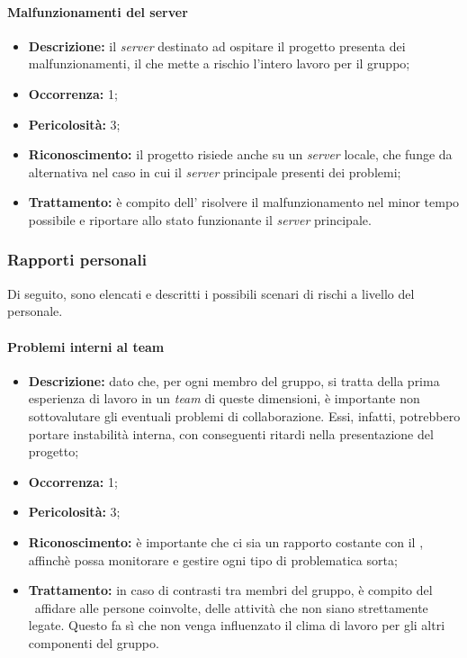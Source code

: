 \paragraph{Malfunzionamenti del server}
\begin{itemize}
	\item \textbf{Descrizione:} il \textit{server} destinato ad ospitare il progetto presenta dei malfunzionamenti, il che mette a rischio l'intero lavoro per il gruppo;
	\item \textbf{Occorrenza:} 1;
	\item \textbf{Pericolosità:} 3;
	\item \textbf{Riconoscimento:} il progetto risiede anche su un \textit{server} locale, che funge da alternativa nel caso in cui il \textit{server} principale presenti dei problemi;
	\item \textbf{Trattamento:} è compito dell'\textit{\Amm} risolvere il malfunzionamento nel minor tempo possibile e riportare allo stato funzionante il \textit{server} principale.
\end{itemize}

\subsubsection{Rapporti personali}

Di seguito, sono elencati e descritti i possibili scenari di rischi a livello del personale.

\paragraph{Problemi interni al team}
\begin{itemize}
	\item \textbf{Descrizione:} dato che, per ogni membro del gruppo, si tratta della prima esperienza di lavoro in un \textit{team} di queste dimensioni, è importante non sottovalutare gli eventuali problemi di collaborazione. Essi, infatti, potrebbero portare instabilità interna, con conseguenti ritardi nella presentazione del progetto;
	\item \textbf{Occorrenza:} 1;
	\item \textbf{Pericolosità:} 3;
	\item \textbf{Riconoscimento:} è importante che ci sia un rapporto costante con il \textit{\RdP}, affinchè possa monitorare e gestire ogni tipo di problematica sorta;
	\item \textbf{Trattamento:} in caso di contrasti tra membri del gruppo, è compito del \textit{\RdP}\ affidare alle persone coinvolte, delle attività che non siano strettamente legate. Questo fa sì che non venga influenzato il clima di lavoro per gli altri componenti del gruppo.
\end{itemize}

